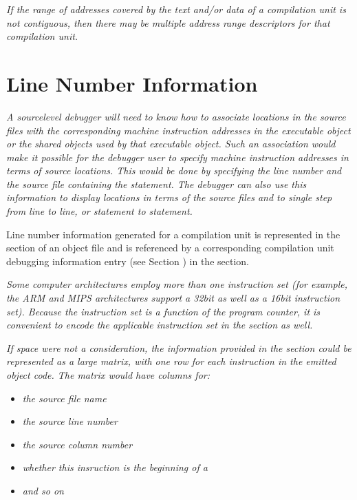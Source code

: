 \textit{If the range of addresses covered by the text and/or data
of a compilation unit is not contiguous, then there may be
multiple address range descriptors for that compilation unit.}




\section{Line Number Information}
\label{chap:linenumberinformation}
\textit{A source\dash level debugger will need to know how to
associate locations in the source files with the corresponding
machine instruction addresses in the executable object or
the shared objects used by that executable object. Such an
association would make it possible for the debugger user
to specify machine instruction addresses in terms of source
locations. This would be done by specifying the line number
and the source file containing the statement. The debugger
can also use this information to display locations in terms
of the source files and to single step from line to line,
or statement to statement.}

Line number information generated for a compilation unit is
represented in the 
 section of an object file and
is referenced by a corresponding compilation unit debugging
information entry 
(see Section ) 
in the 
section.

\textit{Some computer architectures employ more than one instruction
set (for example, the ARM 
and 
MIPS architectures support
a 32\dash bit as well as a 16\dash bit instruction set). Because the
instruction set is a function of the program counter, it is
convenient to encode the applicable instruction set in the
 section as well.}

\textit{If space were not a consideration, the information provided
in the  
section could be represented as a large
matrix, with one row for each instruction in the emitted
object code. The matrix would have columns for:}

\begin{itemize}
\item \textit{the source file name}
\item \textit{the source line number}
\item \textit{the source column number}
\item \textit{whether this insruction is the beginning of a }
\item \textit{and so on}
\end{itemize}

